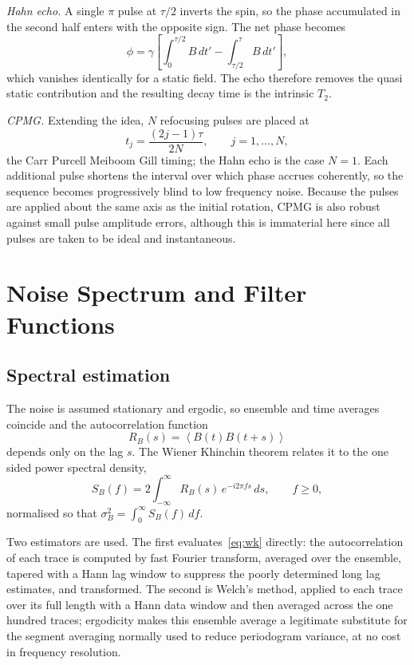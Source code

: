 \documentclass[10pt,twocolumn,a4paper]{article}
\newcommand{\avg}[1]{\left\langle#1\right\rangle}
\begin{document}
\emph{Hahn echo.} A single $\pi$ pulse at $\tau/2$ inverts the spin, so the phase
accumulated in the second half enters with the opposite sign. The net phase
becomes
\begin{equation}
\phi = \gamma\left[\int_0^{\tau/2}\! B\,dt' - \int_{\tau/2}^{\tau}\! B\,dt'\right],
\end{equation}
which vanishes identically for a static field. The echo therefore removes the
quasi static contribution and the resulting decay time is the intrinsic $T_2$.

\emph{CPMG.} Extending the idea, $N$ refocusing pulses are placed at
\begin{equation}
t_j = \frac{(2j-1)\tau}{2N}, \qquad j=1,\dots,N ,
\end{equation}
the Carr Purcell Meiboom Gill timing; the Hahn echo is the case $N=1$. Each
additional pulse shortens the interval over which phase accrues coherently, so
the sequence becomes progressively blind to low frequency noise. Because the pulses
are applied about the same axis as the initial rotation, CPMG is also robust
against small pulse amplitude errors, although this is immaterial here since all
pulses are taken to be ideal and instantaneous.

\section{Noise Spectrum and Filter Functions}\label{sec:psd}

\subsection{Spectral estimation}

The noise is assumed stationary and ergodic, so ensemble and time averages
coincide and the autocorrelation function
\begin{equation}
R_B(s) = \avg{B(t)B(t+s)}
\end{equation}
depends only on the lag $s$. The Wiener Khinchin theorem relates it to the
one sided power spectral density,
\begin{equation}
S_B(f) = 2\int_{-\infty}^{\infty} R_B(s)\,e^{-i2\pi f s}\,ds , \qquad f \ge 0 ,
\label{eq:wk}
\end{equation}
normalised so that $\sigma_B^2 = \int_0^\infty S_B(f)\,df$.

Two estimators are used. The first evaluates~\eqref{eq:wk} directly: the
autocorrelation of each trace is computed by fast Fourier transform, averaged over
the ensemble, tapered with a Hann lag window to suppress the poorly determined
long lag estimates, and transformed. The second is Welch's method, applied to each
trace over its full length with a Hann data window and then averaged across the
one hundred traces; ergodicity makes this ensemble average a legitimate substitute
for the segment averaging normally used to reduce periodogram variance, at no cost
in frequency resolution.
\end{document}
